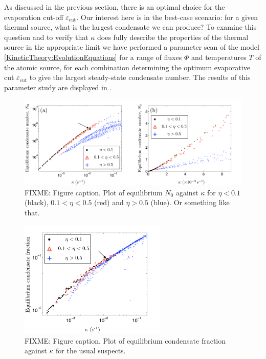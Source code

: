 As discussed in the previous section, there is an optimal choice for the evaporation cut-off $\varepsilon_\text{cut}$. Our interest here is in the best-case scenario: for a given thermal source, what is the largest condensate we can produce? To examine this question and to verify that $\kappa$ does fully describe the properties of the thermal source in the appropriate limit we have performed a parameter scan of the model \eqref{KineticTheory:EvolutionEquations} for a range of fluxes $\Phi$ and temperatures $T$ of the atomic source, for each combination determining the optimum evaporative cut $\varepsilon_\text{cut}$ to give the largest steady-state condensate number. The results of this parameter study are displayed in .

\begin{figure}
    \centering
    \includegraphics[width=15cm]{FigureOfMerit}
    \caption{FIXME: Figure caption. Plot of equilibrium $N_0$ against $\kappa$ for $\eta < 0.1$ (black), $0.1 < \eta < 0.5$ (red) and $\eta > 0.5$ (blue). Or something like that.}
    \label{KineticTheory:FigureOfMerit}
\end{figure}

\begin{figure}
    \centering
    \includegraphics[width=7cm]{CondensateFraction}
    \caption{FIXME: Figure caption. Plot of equilibrium condensate fraction against $\kappa$ for the usual suspects.}
    \label{KineticTheory:CondensateFraction}
\end{figure}

